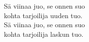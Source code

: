 
            Sä viinaa juo, se onnen suo \\
            kohta tarjoilija uuden tuo. \\
            Sä viinaa juo, se onnen suo \\
            kohta tarjoilija laskun tuo. \\
